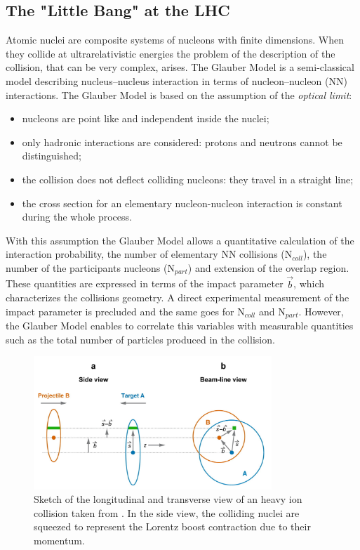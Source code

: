 %
\subsection{The "Little Bang" at the LHC}
\label{sec:1.3.1}

Atomic nuclei are composite systems of nucleons with finite dimensions. When they collide at 
ultrarelativistic energies the problem of the description of the collision, that can be very
complex, arises.
The Glauber Model \cite{glauber} is a semi-classical model describing nucleus–nucleus 
interaction in terms of nucleon–nucleon (NN) interactions.
The Glauber Model is based on the assumption of the \textit{optical limit}:
\begin{itemize}
    \item nucleons are point like and independent inside the nuclei;
    \item only hadronic interactions are considered: protons and neutrons cannot be distinguished;
    \item the collision does not deflect colliding nucleons: they travel in a straight line;
    \item the cross section for an elementary nucleon-nucleon interaction is constant during the whole 
    process.
\end{itemize}
With this assumption the Glauber Model allows a quantitative calculation of the interaction
probability, the number of elementary NN collisions ($\mathrm{N}_{coll}$), the number
of the participants nucleons ($\mathrm{N}_{part}$) and extension of the overlap region.
These quantities are expressed in terms of the impact parameter $\vec{b}$, which characterizes
the collisions geometry.
A direct experimental measurement of the impact parameter is precluded and the same goes for
$\mathrm{N}_{coll}$ and $\mathrm{N}_{part}$.
However, the Glauber Model enables to correlate this variables with measurable quantities
such as the total number of particles produced in the collision.

\begin{figure}[!h]
    \centering
    \includegraphics[width=0.8\textwidth]{gfx/glauber}
	\caption{Sketch of the longitudinal and transverse view of an heavy ion collision taken from \cite{glauber}. In the side view, the colliding nuclei are squeezed to represent the Lorentz boost contraction due to their momentum.}
	\label{fig:glauber}
\end{figure}

